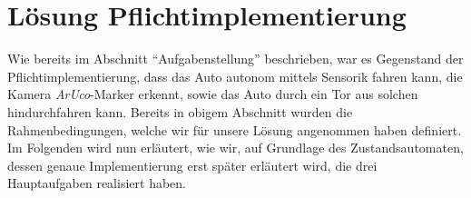 \section{L\"osung Pflichtimplementierung}
\label{sec:lsgpflicht}

Wie bereits im Abschnitt "`Aufgabenstellung"' beschrieben, war es Gegenstand der Pflichtimplementierung, dass das Auto autonom mittels Sensorik fahren kann, die Kamera \textit{ArUco}-Marker erkennt, sowie das Auto durch ein Tor aus solchen hindurchfahren kann. Bereits in obigem Abschnitt wurden die Rahmenbedingungen, welche wir für unsere Lösung angenommen haben definiert. Im Folgenden wird nun erläutert, wie wir, auf Grundlage des Zustandsautomaten, dessen genaue Implementierung erst später erläutert wird, die drei Hauptaufgaben realisiert haben.

